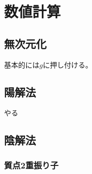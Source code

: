 \documentclass{jsarticle}
\begin{document}
\section{数値計算}

\subsection{無次元化}

基本的には$g$に押し付ける。

\subsection{陽解法}

やる

\subsection{陰解法}

\subsubsection{質点2重振り子}
\end{document}
